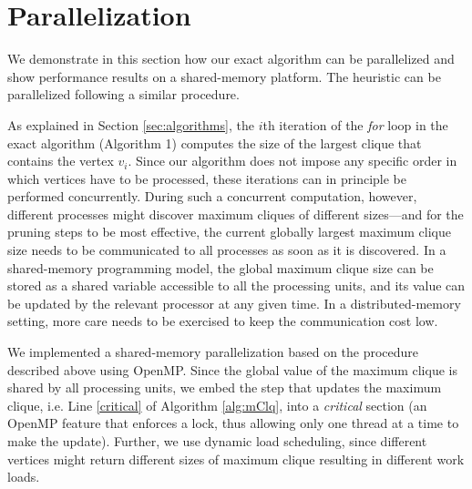 \section{Parallelization}
\label{sec:parallelization}


 We demonstrate in this section how our exact algorithm can be parallelized and show performance results
on a shared-memory platform. The heuristic can be parallelized following a similar procedure.

As explained in Section \ref{sec:algorithms}, the $i$th iteration of the {\em for} loop in the exact algorithm (Algorithm 1) computes the size of the largest clique that contains the vertex $v_i$. Since our algorithm does not impose any specific order in which vertices have to be processed, these iterations can in principle be performed concurrently. During such a concurrent computation, however, different processes might discover maximum cliques of different sizes---and for the pruning steps to be most effective, the current globally largest maximum clique size needs to be communicated to all processes as soon as it is discovered. In a shared-memory programming model, the global maximum clique size can be stored as a shared variable accessible to all the processing units, and its value can be updated by the relevant processor at any given time. In a distributed-memory setting, more care needs to be exercised to keep the communication cost low. 

We implemented a shared-memory parallelization based on the procedure described above using OpenMP. Since the global value of the maximum clique is shared by all processing units, we embed the step that updates the maximum clique, i.e. Line \ref{critical} of Algorithm \ref{alg:mClq}, into a {\it critical} section (an OpenMP feature that enforces a lock, thus allowing only one thread at a time to make the update). Further, we use dynamic load scheduling, since different vertices might return different sizes of maximum clique resulting in different work loads.

